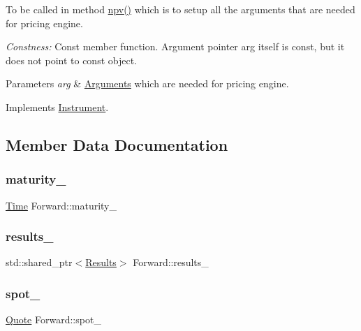 To be called in method \hyperlink{class_instrument_aa750f2ae95a21d65a073da3171e8d084}{npv()} which is to setup all the arguments that are needed for pricing engine. 

{\itshape Constness\+:} Const member function. Argument pointer arg itself is const, but it does not point to const object. 
\begin{DoxyParams}{Parameters}
{\em arg} & \hyperlink{class_forward_1_1_arguments}{Arguments} which are needed for pricing engine. \\
\hline
\end{DoxyParams}


Implements \hyperlink{class_instrument_a5cd384be384fe415f09ecc78e2a87539}{Instrument}.



\subsection{Member Data Documentation}
\hypertarget{class_forward_ad599104a13c33fbf31e9214af904e9aa}{}\label{class_forward_ad599104a13c33fbf31e9214af904e9aa} 
\subsubsection{\texorpdfstring{maturity\+\_\+}{maturity\_}}
{\footnotesize\ttfamily \hyperlink{_name_def_8h_ac2d3e0ba793497bcca555c7c2cf64ff3}{Time} Forward\+::maturity\+\_\+\hspace{0.3cm}{\ttfamily [private]}}

\hypertarget{class_forward_abead12e748980177fb67f98bcffbf817}{}\label{class_forward_abead12e748980177fb67f98bcffbf817} 
\subsubsection{\texorpdfstring{results\+\_\+}{results\_}}
{\footnotesize\ttfamily std\+::shared\+\_\+ptr$<$\hyperlink{class_forward_1_1_results}{Results}$>$ Forward\+::results\+\_\+}

\hypertarget{class_forward_a362d0396ceda462e504f77120339f8b0}{}\label{class_forward_a362d0396ceda462e504f77120339f8b0} 
\subsubsection{\texorpdfstring{spot\+\_\+}{spot\_}}
{\footnotesize\ttfamily \hyperlink{_name_def_8h_a642a6c5fd87319d922637de0e0bb0305}{Quote} Forward\+::spot\+\_\+\hspace{0.3cm}{\ttfamily [private]}}

